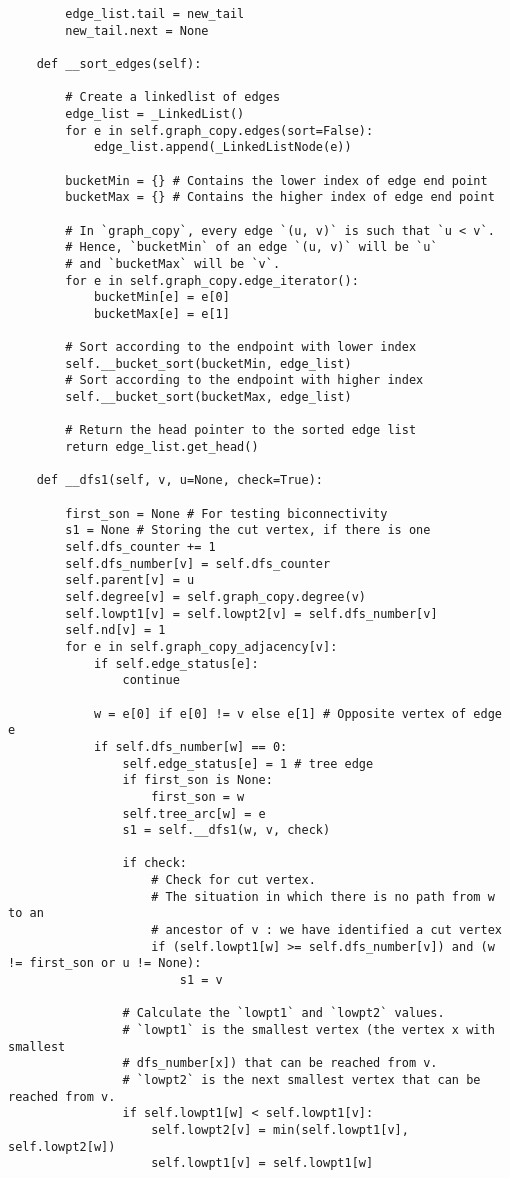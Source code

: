 \begin{verbatim}
		edge_list.tail = new_tail
		new_tail.next = None

	def __sort_edges(self):

		# Create a linkedlist of edges
		edge_list = _LinkedList()
		for e in self.graph_copy.edges(sort=False):
			edge_list.append(_LinkedListNode(e))

		bucketMin = {} # Contains the lower index of edge end point
		bucketMax = {} # Contains the higher index of edge end point

		# In `graph_copy`, every edge `(u, v)` is such that `u < v`.
		# Hence, `bucketMin` of an edge `(u, v)` will be `u`
		# and `bucketMax` will be `v`.
		for e in self.graph_copy.edge_iterator():
			bucketMin[e] = e[0]
			bucketMax[e] = e[1]

		# Sort according to the endpoint with lower index
		self.__bucket_sort(bucketMin, edge_list)
		# Sort according to the endpoint with higher index
		self.__bucket_sort(bucketMax, edge_list)

		# Return the head pointer to the sorted edge list
		return edge_list.get_head()

	def __dfs1(self, v, u=None, check=True):

		first_son = None # For testing biconnectivity
		s1 = None # Storing the cut vertex, if there is one
		self.dfs_counter += 1
		self.dfs_number[v] = self.dfs_counter
		self.parent[v] = u
		self.degree[v] = self.graph_copy.degree(v)
		self.lowpt1[v] = self.lowpt2[v] = self.dfs_number[v]
		self.nd[v] = 1
		for e in self.graph_copy_adjacency[v]:
			if self.edge_status[e]:
				continue

			w = e[0] if e[0] != v else e[1] # Opposite vertex of edge e
			if self.dfs_number[w] == 0:
				self.edge_status[e] = 1 # tree edge
				if first_son is None:
					first_son = w
				self.tree_arc[w] = e
				s1 = self.__dfs1(w, v, check)

				if check:
					# Check for cut vertex.
					# The situation in which there is no path from w to an
					# ancestor of v : we have identified a cut vertex
					if (self.lowpt1[w] >= self.dfs_number[v]) and (w != first_son or u != None):
						s1 = v

				# Calculate the `lowpt1` and `lowpt2` values.
				# `lowpt1` is the smallest vertex (the vertex x with smallest
				# dfs_number[x]) that can be reached from v.
				# `lowpt2` is the next smallest vertex that can be reached from v.
				if self.lowpt1[w] < self.lowpt1[v]:
					self.lowpt2[v] = min(self.lowpt1[v], self.lowpt2[w])
					self.lowpt1[v] = self.lowpt1[w]


\end{verbatim}
